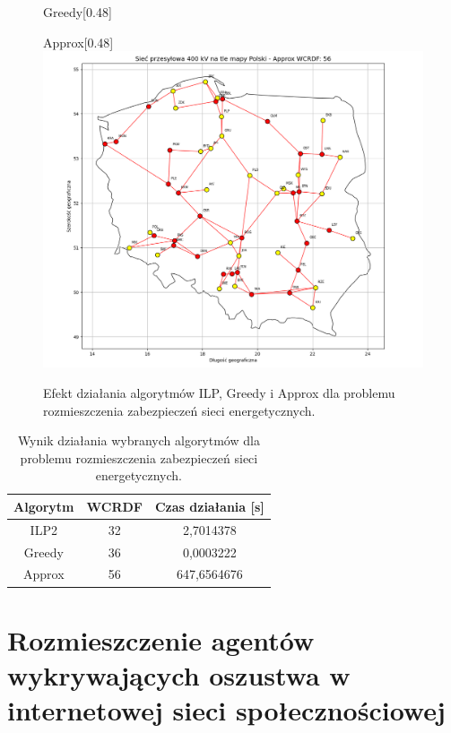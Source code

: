 \begin{figure}[htbp]
\begin{subcaptionbox}{Greedy\label{fig:img2}}[0.48\linewidth]
    \end{subcaptionbox}
    \hfill
    \begin{subcaptionbox}{Approx\label{fig:img1}}[0.48\linewidth]
        {\includegraphics[width=\linewidth]{assets/Poland/img_1.png}}
    \end{subcaptionbox}
    \caption{Efekt działania algorytmów ILP, Greedy i Approx dla problemu rozmieszczenia zabezpieczeń sieci energetycznych.}
    \label{fig:poland}
\end{figure}

\begin{table}[H]
    \centering
    \begin{tabular}{|c|c|c|}
        \hline
    Algorytm & WCRDF & Czas działania [s] \\     \hline
    ILP2 & 32 & 2,7014378 \\ \hline
    Greedy & 36 & 0,0003222 \\ \hline
Approx & 56 & 647,6564676 \\ \hline
\end{tabular}
\caption{Wynik działania wybranych algorytmów dla problemu rozmieszczenia zabezpieczeń sieci energetycznych.}
\end{table}

\section{Rozmieszczenie agentów wykrywających oszustwa w internetowej sieci społecznościowej}

